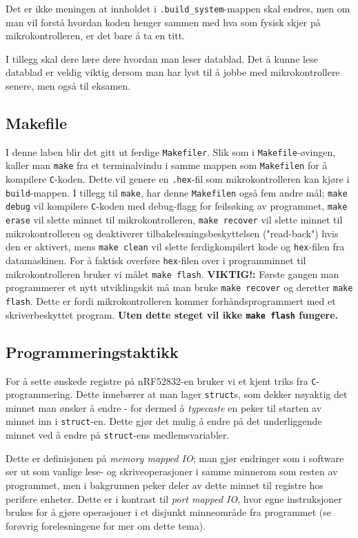 \begin{alphasection}
Det er ikke meningen at innholdet i \verb|.build_system|-mappen skal endres, men om man vil forstå hvordan koden henger sammen med hva som fysisk skjer på mikrokontrolleren, er det bare å ta en titt.

I tillegg skal dere lære dere hvordan man leser datablad. Det å kunne lese datablad er veldig viktig dersom man har lyst til å jobbe med mikrokontrollere senere, men også til eksamen.

\subsection{Makefile}

I denne laben blir det gitt ut ferdige \verb|Makefiler|. Slik som i \verb|Makefile|-øvingen, kaller man \verb|make| fra et terminalvindu i samme mappen som \verb|Makefilen| for å kompilere \verb|C|-koden. Dette vil genere en \verb|.hex|-fil som mikrokontrolleren kan kjøre i \verb|build|-mappen. I tillegg til \verb|make|, har denne \verb|Makefilen| også fem andre mål; \verb|make debug| vil kompilere \verb|C|-koden med debug-flagg for feilsøking av programmet, \verb|make erase| vil slette minnet til mikrokontrolleren, \verb|make recover| vil slette minnet til mikrokontrolleren og deaktiverer tilbakelesningsbeskyttelsen ("read-back") hvis den er aktivert, mens \verb|make clean| vil slette ferdigkompilert kode og \verb|hex|-filen fra datamaskinen. For å faktisk overføre \verb|hex|-filen over i programminnet til mikrokontrolleren bruker vi målet \verb|make flash|. {\bf{VIKTIG!:}} Første gangen man programmerer et nytt utviklingskit må man bruke \verb|make recover| og deretter \verb|make flash|. Dette er fordi mikrokontrolleren kommer forhåndsprogrammert med et skriverbeskyttet program. {\bf{Uten dette steget vil ikke \verb|make flash| fungere.}}

\subsection{Programmeringstaktikk}

For å sette ønskede registre på nRF52832-en bruker vi et kjent triks fra \verb|C|-programmering. Dette innebærer at man lager \verb|struct|s, som dekker nøyaktig det minnet man ønsker å endre - for dermed å \textit{typecaste} en peker til starten av minnet inn i \verb|struct|-en. Dette gjør det mulig å endre på det underliggende minnet ved å endre på \verb|struct|-ens medlemsvariabler.

Dette er definisjonen på \textit{memory mapped IO}; man gjør endringer som i software ser ut som vanlige lese- og skriveoperasjoner i samme minnerom som resten av programmet, men i bakgrunnen peker deler av dette minnet til registre hos perifere enheter. Dette er i kontrast til \textit{port mapped IO}, hvor egne instruksjoner brukes for å gjøre operasjoner i et disjunkt minneområde fra programmet (se forøvrig forelesningene for mer om dette tema).


\end{alphasection}
